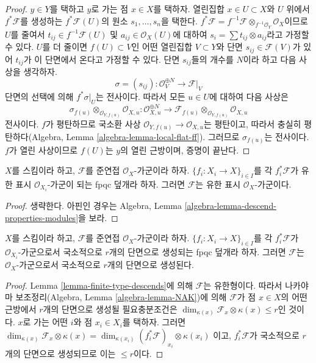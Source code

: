 \begin{proof}
$y \in Y$를 택하고 $y$로 가는 점 $x \in X$를 택하자. 열린집합
$x \in U \subset X$와 $U$ 위에서 $f^*\mathcal{F}$를 생성하는
$f^*\mathcal{F}(U)$의 원소 $s_1, \ldots, s_n$을 택한다.
$f^*\mathcal{F} =
f^{-1}\mathcal{F} \otimes_{f^{-1}\mathcal{O}_Y} \mathcal{O}_X$이므로 $U$를
줄여서 $t_{ij} \in f^{-1}\mathcal{F}(U)$ 및
$a_{ij} \in \mathcal{O}_X(U)$에 대하여
$s_i = \sum t_{ij} \otimes a_{ij}$라고 가정할 수 있다. $U$를 더 줄이면
$f(U) \subset V$인 어떤 열린집합 $V \subset Y$와 단면
$s_{ij} \in \mathcal{F}(V)$가 있어 $t_{ij}$가 이 단면에서 온다고 가정할
수 있다. 단면 $s_{ij}$들의 개수를 $N$이라 하고 다음 사상을 생각하자.
$$
\sigma = (s_{ij}) : \mathcal{O}_V^{\oplus N} \to \mathcal{F}|_V
$$
단면의 선택에 의해 $f^*\sigma|_U$는 전사이다. 따라서 모든 $u \in U$에
대하여 다음 사상은
$$
\sigma_{f(u)} \otimes_{\mathcal{O}_{Y, f(u)}} \mathcal{O}_{X, u} :
\mathcal{O}_{X, u}^{\oplus N}
\longrightarrow
\mathcal{F}_{f(u)} \otimes_{\mathcal{O}_{Y, f(u)}} \mathcal{O}_{X, u}
$$
전사이다. $f$가 평탄하므로 국소환 사상
$\mathcal{O}_{Y, f(u)} \to \mathcal{O}_{X, u}$는 평탄이고, 따라서 충실히
평탄하다(Algebra, Lemma \ref{algebra-lemma-local-flat-ff}). 그러므로
$\sigma_{f(u)}$는 전사이다. $f$가 열린 사상이므로 $f(U)$는 $y$의 열린
근방이며, 증명이 끝난다.
\end{proof}

\begin{lemma}
\label{lemma-finite-presentation-descends}
$X$를 스킴이라 하고, $\mathcal{F}$를 준연접 $\mathcal{O}_X$-가군이라
하자. $\{f_i : X_i \to X\}_{i \in I}$를 각 $f_i^*\mathcal{F}$가 유한 표시
$\mathcal{O}_{X_i}$-가군이 되는 fpqc 덮개라 하자. 그러면 $\mathcal{F}$는
유한 표시 $\mathcal{O}_X$-가군이다.
\end{lemma}

\begin{proof}
생략한다. 아핀인 경우는 Algebra, Lemma
\ref{algebra-lemma-descend-properties-modules}을 보라.
\end{proof}

\begin{lemma}
\label{lemma-locally-generated-by-r-sections-descends}
$X$를 스킴이라 하고, $\mathcal{F}$를 준연접 $\mathcal{O}_X$-가군이라
하자. $\{f_i : X_i \to X\}_{i \in I}$를 각 $f_i^*\mathcal{F}$가
$\mathcal{O}_{X_i}$-가군으로서 국소적으로 $r$개의 단면으로 생성되는
fpqc 덮개라 하자. 그러면 $\mathcal{F}$는 $\mathcal{O}_X$-가군으로서
국소적으로 $r$개의 단면으로 생성된다.
\end{lemma}

\begin{proof}
Lemma \ref{lemma-finite-type-descends}에 의해 $\mathcal{F}$는 유한형이다.
따라서 나카야마 보조정리(Algebra, Lemma \ref{algebra-lemma-NAK})에 의해
$\mathcal{F}$가 점 $x \in X$의 어떤 근방에서 $r$개의 단면으로 생성될
필요충분조건은
$\dim_{\kappa(x)} \mathcal{F}_x \otimes \kappa(x) \leq r$인 것이다.
$x$로 가는 어떤 $i$와 점 $x_i \in X_i$를 택하자. 그러면
$\dim_{\kappa(x)} \mathcal{F}_x \otimes \kappa(x) = 
\dim_{\kappa(x_i)} (f_i^*\mathcal{F})_{x_i} \otimes \kappa(x_i)$
이고, $f_i^*\mathcal{F}$가 국소적으로 $r$개의 단면으로 생성되므로 이는
$\leq r$이다.
\end{proof}

